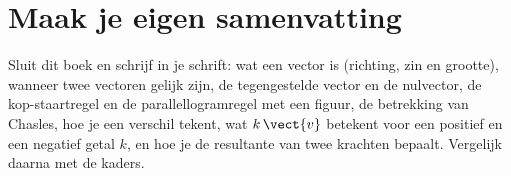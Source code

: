 \ifzelfstudie
\section*{Maak je eigen samenvatting}
Sluit dit boek en schrijf in je schrift: wat een vector is (richting, zin en grootte), wanneer twee vectoren gelijk zijn, de tegengestelde vector en de nulvector, de kop-staartregel en de parallellogramregel met een figuur, de betrekking van Chasles, hoe je een verschil tekent, wat $k\,\vect{v}$ betekent voor een positief en een negatief getal $k$, en hoe je de resultante van twee krachten bepaalt. Vergelijk daarna met de kaders.
\fi
